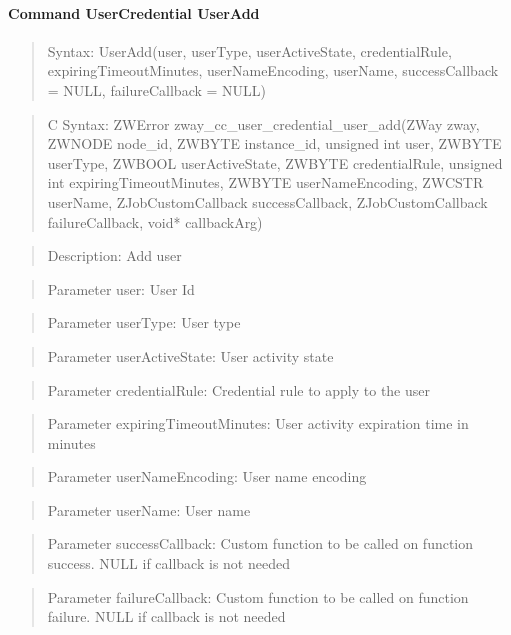 \paragraph{Command UserCredential UserAdd}
\begin{quote}Syntax: UserAdd(user, userType, userActiveState, credentialRule, expiringTimeoutMinutes, userNameEncoding, userName, successCallback = NULL, failureCallback = NULL)\end{quote}
\begin{quote}C Syntax: ZWError zway\_cc\_user\_credential\_user\_add(ZWay zway, ZWNODE node\_id, ZWBYTE instance\_id, unsigned int user, ZWBYTE userType, ZWBOOL userActiveState, ZWBYTE credentialRule, unsigned int expiringTimeoutMinutes, ZWBYTE userNameEncoding, ZWCSTR userName, ZJobCustomCallback successCallback, ZJobCustomCallback failureCallback, void* callbackArg)\end{quote}
\begin{quote}Description: Add user\end{quote}
\begin{quote}Parameter user: User Id\end{quote}
\begin{quote}Parameter userType: User type\end{quote}
\begin{quote}Parameter userActiveState: User activity state\end{quote}
\begin{quote}Parameter credentialRule: Credential rule to apply to the user\end{quote}
\begin{quote}Parameter expiringTimeoutMinutes: User activity expiration time in minutes\end{quote}
\begin{quote}Parameter userNameEncoding: User name encoding\end{quote}
\begin{quote}Parameter userName: User name\end{quote}
\begin{quote}Parameter successCallback: Custom function to be called on function success. NULL if callback is not needed\end{quote}
\begin{quote}Parameter failureCallback: Custom function to be called on function failure. NULL if callback is not needed\end{quote}


